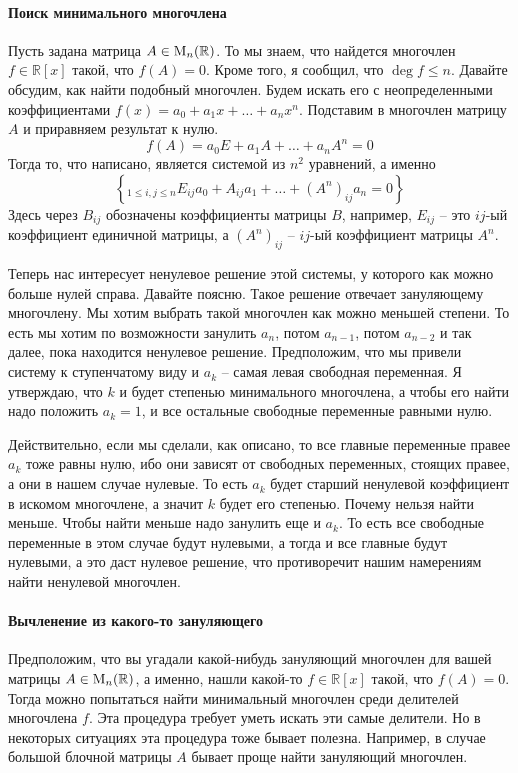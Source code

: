 \paragraph{Поиск минимального многочлена}

Пусть задана матрица $A\in \operatorname{M}_{n}(\mathbb R)$.
То мы знаем, что найдется многочлен $f\in\mathbb R[x]$ такой, что $f(A) = 0$.
Кроме того, я сообщил, что $\deg f\leqslant n$.
Давайте обсудим, как найти подобный многочлен.
Будем искать его с неопределенными коэффициентами $f(x) = a_0 + a_1 x + \ldots + a_n x^n$.
Подставим в многочлен матрицу $A$ и приравняем результат к нулю.
\[
f(A) = a_0 E + a_1 A + \ldots + a_n A^n = 0
\]
Тогда то, что написано, является системой из $n^2$ уравнений, а именно
\[
\left\{_{1\leqslant i,j\leqslant n}
E_{ij}a_0 + A_{ij}a_1 + \ldots + (A^n)_{ij}a_n = 0
\right\}
\]
Здесь через $B_{ij}$ обозначены коэффициенты матрицы $B$, например, $E_{ij}$ -- это $ij$-ый коэффициент единичной матрицы, а $(A^n)_{ij}$ -- $ij$-ый коэффициент матрицы $A^n$.

Теперь нас интересует ненулевое решение этой системы, у которого как можно больше нулей справа.
Давайте поясню.
Такое решение отвечает зануляющему многочлену.
Мы хотим выбрать такой многочлен как можно меньшей степени.
То есть мы хотим по возможности занулить $a_n$, потом $a_{n-1}$, потом $a_{n-2}$ и так далее, пока находится ненулевое решение.
Предположим, что мы привели систему к ступенчатому виду и $a_k$ -- самая левая свободная переменная.
Я утверждаю, что $k$ и будет степенью минимального многочлена, а чтобы его найти надо положить $a_k = 1$, и все остальные свободные переменные равными нулю.

Действительно, если мы сделали, как описано, то все главные переменные правее $a_k$ тоже равны нулю, ибо они зависят от свободных переменных, стоящих правее, а они в нашем случае нулевые.
То есть $a_k$ будет старший ненулевой коэффициент в искомом многочлене, а значит $k$ будет его степенью.
Почему нельзя найти меньше.
Чтобы найти меньше надо занулить еще и $a_k$.
То есть все свободные переменные в этом случае будут нулевыми, а тогда и все главные будут нулевыми, а это даст нулевое решение, что противоречит нашим намерениям найти ненулевой многочлен.

\paragraph{Вычленение из какого-то зануляющего}

Предположим, что вы угадали какой-нибудь зануляющий многочлен для вашей матрицы $A\in\operatorname{M}_{n}(\mathbb R)$, а именно, нашли какой-то $f\in \mathbb R[x]$ такой, что $f(A) = 0$.
Тогда можно попытаться найти минимальный многочлен среди делителей многочлена $f$.
Эта процедура требует уметь искать эти самые делители.
Но в некоторых ситуациях эта процедура тоже бывает полезна.
Например, в случае большой блочной матрицы $A$ бывает проще найти зануляющий многочлен.

